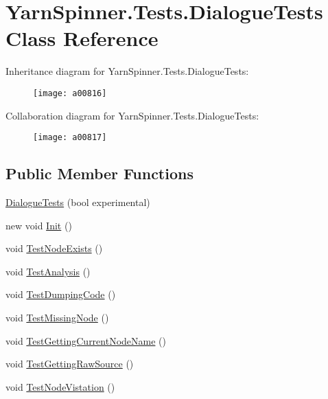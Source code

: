 \hypertarget{a00094}{\section{Yarn\-Spinner.\-Tests.\-Dialogue\-Tests Class Reference}
\label{a00094}
}


Inheritance diagram for Yarn\-Spinner.\-Tests.\-Dialogue\-Tests\-:
\nopagebreak
\begin{figure}[H]
\begin{center}
\leavevmode
\texttt{[image: a00816]}
\end{center}
\end{figure}


Collaboration diagram for Yarn\-Spinner.\-Tests.\-Dialogue\-Tests\-:
\nopagebreak
\begin{figure}[H]
\begin{center}
\leavevmode
\texttt{[image: a00817]}
\end{center}
\end{figure}
\subsection*{Public Member Functions}
\begin{DoxyCompactItemize}
\item 
\hyperlink{a00094_a4c826102af9c6b062138d72b24e7a37b}{Dialogue\-Tests} (bool experimental)
\item 
new void \hyperlink{a00094_a49813a64c710540348c15365a672e675}{Init} ()
\item 
void \hyperlink{a00094_a9d4171827bf3eba4c6ae52760a475f45}{Test\-Node\-Exists} ()
\item 
void \hyperlink{a00094_a40b0efb3cac1715b44640c29988139f1}{Test\-Analysis} ()
\item 
void \hyperlink{a00094_a111f0f8418baaeaf83cfb422c90210e0}{Test\-Dumping\-Code} ()
\item 
void \hyperlink{a00094_a013d5e3847b9d716b39aa925d70b99fd}{Test\-Missing\-Node} ()
\item 
void \hyperlink{a00094_afbb342ea64e33ee19d42a6a2c949592a}{Test\-Getting\-Current\-Node\-Name} ()
\item 
void \hyperlink{a00094_a16ed34de323da529e1a17670f556791c}{Test\-Getting\-Raw\-Source} ()
\item 
void \hyperlink{a00094_a9c0d2732044b273929dbce35358a1906}{Test\-Node\-Vistation} ()
\end{DoxyCompactItemize}
